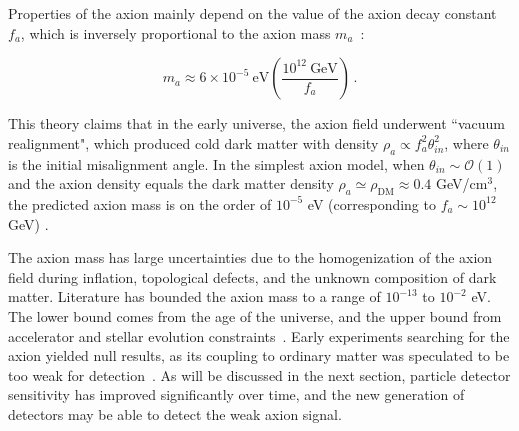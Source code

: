 
    Properties of the axion mainly depend on the value of the axion decay constant $f_a$, which is inversely proportional to the axion mass $m_a$~\cite{Weinberg:1978ma}:
    
    \begin{equation}
        m_a \approx  6 \times10^{-5}~\text{eV} \left( \frac{10^{12}~\text{GeV}}{f_a} \right) \,.
        \label{eq:massscaling}
    \end{equation}
    
    \noindent This theory claims that in the early universe, the axion field underwent ``vacuum realignment", which produced cold dark matter with density $\rho_a \propto f_a^2 \theta_{in}^2$, where $\theta_{in}$ is the initial misalignment angle. In the simplest axion model, when $\theta_{in} \sim \mathcal{O}(1)$ and the axion density equals the dark matter density $\rho_a \simeq \rho_{\text{DM}} \approx 0.4$ GeV/cm$^3$, the predicted axion mass is on the order of $10^{-5}$ eV (corresponding to $f_a \sim 10^{12}$ GeV) \cite{Braine:2024nzi}. 
    
    The axion mass has large uncertainties due to the homogenization of the axion field during inflation, topological defects, and the unknown composition of dark matter. Literature has bounded the axion mass to a range of $10^{-13}$ to $10^{-2}$ eV. The lower bound comes from the age of the universe, and the upper bound from accelerator and stellar evolution constraints~\cite{Sikivie:1983ip}. Early experiments searching for the axion yielded null results, as its coupling to ordinary matter was speculated to be too weak for detection~\cite{Sikivie:2020zpn}. As will be discussed in the next section, particle detector sensitivity has improved significantly over time, and the new generation of detectors may be able to detect the weak axion signal.
        
